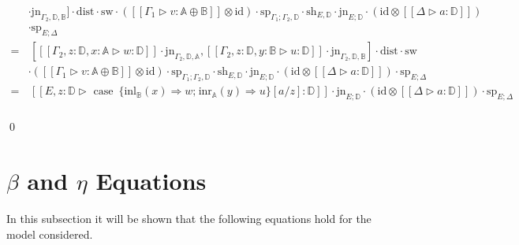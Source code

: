 \begin{equation*}
\begin{split}
      & \cdot\text{jn}_{\Gamma_2, \mathbb{D}, \mathbb{B}}]\cdot \text{dist} \cdot \text{sw} \cdot ([\![\Gamma_1 \triangleright v  : \mathbb{A} \oplus \mathbb{B}  ]\!] \otimes \text{id}) \cdot \text{sp}_{\Gamma_1;\Gamma_2, \mathbb{D}}  \cdot \text{sh}_{E,\mathbb{D}} \cdot \text{jn}_{E; \mathbb{D}} \cdot (\text{id} \otimes [\![ \Delta \triangleright a:\mathbb{D}  ]\!] ) \\
      &\cdot \text{sp}_{E;\Delta}  \\
      = &  \hspace{2pt} \left[[\![ \Gamma_2, z:\mathbb{D}, x:\mathbb{A} \triangleright w: \mathbb{D}  ]\!] \cdot  \text{jn}_{\Gamma_2, \mathbb{D}, \mathbb{A}} ,   [\![ \Gamma_2, z:\mathbb{D} , y:\mathbb{B} \triangleright u : \mathbb{D}  ]\!] \cdot \text{jn}_{\Gamma_2, \mathbb{D}, \mathbb{B}}\right] \cdot \text{dist} \cdot \text{sw}  \\
      & \cdot ([\![\Gamma_1 \triangleright v  : \mathbb{A} \oplus \mathbb{B}  ]\!] \otimes \text{id}) \cdot \text{sp}_{\Gamma_1; \Gamma_2, \mathbb{D}} \cdot \text{sh}_{E,\mathbb{D}} \cdot \text{jn}_{E; \mathbb{D}} \cdot (\text{id} \otimes [\![ \Delta \triangleright a:\mathbb{D}  ]\!] ) \cdot \text{sp}_{E;\Delta} \\
      = & \hspace{2pt}[\![E, z:\mathbb{D} \triangleright \text{ case }  \hspace{2pt}  \{\text{inl}_{\mathbb{B}} (x) \Rightarrow w ; \hspace{1pt} \text{inr}_{\mathbb{A}} (y) \Rightarrow u\} [a/z]: \mathbb{D}]\!] \cdot \text{jn}_{E; \mathbb{D}} \cdot (\text{id} \otimes [\![ \Delta \triangleright a:\mathbb{D}  ]\!] ) \cdot \text{sp}_{E;\Delta} \\
    \end{split}
      \end{equation*}

      \qed

\section{ \boldmath $\beta$ and $\eta$ Equations}


In this subsection it will be shown that the following equations hold for the model considered.

